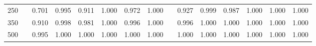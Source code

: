 % 
\begin{tabular}{ccccccccccccccc}
  \hline
  \hline
250 &  & 0.701 & 0.995 & 0.911 & 1.000 & 0.972 & 1.000 &  & 0.927 & 0.999 & 0.987 & 1.000 & 1.000 & 1.000 \\ 
  350 &  & 0.910 & 0.998 & 0.981 & 1.000 & 0.996 & 1.000 &  & 0.996 & 1.000 & 1.000 & 1.000 & 1.000 & 1.000 \\ 
  500 &  & 0.995 & 1.000 & 1.000 & 1.000 & 1.000 & 1.000 &  & 1.000 & 1.000 & 1.000 & 1.000 & 1.000 & 1.000 \\ 
   \hline
\end{tabular}
